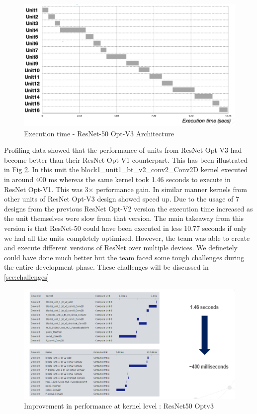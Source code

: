 \begin{figure}[!htb]
  \includegraphics[width=\textwidth,height=\textheight,keepaspectratio]{img/ResNet_OptV3_execution.png}
  \caption{Execution time - ResNet-50 Opt-V3 Architecture}
  \label{fig:ResNet50_Optv3}
\end{figure}
Profiling data showed that the performance of units from ResNet Opt-V3 had become better than their ResNet Opt-V1 counterpart. This has been illustrated in Fig \ref{fig:ResNet50_Optv3_kernel}. In this unit the block1\_unit1\_bt\_v2\_conv2\_Conv2D kernel executed in around 400 ms whereas the same kernel took 1.46 seconds to execute in ResNet Opt-V1. This was 3$\times$ performance gain. In similar manner kernels from other units of ResNet Opt-V3 design showed speed up. Due to the usage of 7 designs from the previous ResNet Opt-V2 version the execution time increased as the unit themselves were slow from that version. 
\newline
The main takeaway from this version is that ResNet-50 could have been executed in less 10.77 seconds if only we had all the units completely optimised. However, the team was able to create and execute different versions of ResNet over multiple devices. We definetely could have done much better but the team faced some tough challenges during the entire development phase. These challenges will be discussed in \ref{sec:challenges}

\begin{figure}[H]
  \includegraphics[width=\textwidth,height=\textheight,keepaspectratio]{img/ResNet_OptV3_performance.png}
  \caption{Improvement in performance at kernel level : ResNet50 Optv3}
  \label{fig:ResNet50_Optv3_kernel}
\end{figure}
